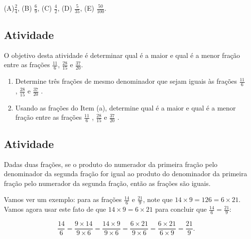 \documentclass[a4,12pt]{book}
\begin{document}
(A)$\frac{2}{4}$, (B) $\frac{6}{9}$, (C) $\frac{4}{2}$, (D) $\frac{5}{35}$, (E) $\frac{50}{100}$.






\subsection{Atividade}







O objetivo desta atividade é determinar qual é a maior e qual é a menor fração entre
as frações $\frac{11}{6}$, $\frac{28}{15}$ e $\frac{37}{20}$.

\begin{enumerate} [\quad a)] %
  \item     Determine três frações de mesmo denominador que sejam iguais às frações     $\frac{11}{6}$    ,     $\frac{28}{15}$     e     $\frac{37}{20}$    .
  \item     Usando as frações do Item (a), determine qual é a maior e qual é a menor fração entre as frações     $\frac{11}{6}$    ,     $\frac{28}{15}$     e     $\frac{37}{20}$    .
\end{enumerate} %









\subsection{Atividade}







Dadas duas frações, se o produto do numerador da primeira fração pelo denominador da segunda fração for igual ao produto do denominador da primeira fração pelo numerador da segunda fração, então as frações são iguais. 

Vamos ver um exemplo: para as frações $\frac{14}{6}$ e $\frac{21}{9}$, note que  $14 \times 9 = 126 = 6 \times 21$. Vamos agora usar este fato de que $14 \times 9 = 6 \times 21$
para concluir que $\frac{14}{6} = \frac{21}{9}$:

$$\frac{14}{6} = \frac{9 \times 14}{9 \times 6} = \frac{14 \times 9}{9 \times 6} = \frac{6 \times 21}{9 \times 6} = \frac{6 \times 21}{6 \times 9} = \frac{21}{9}.$$
\end{document}
